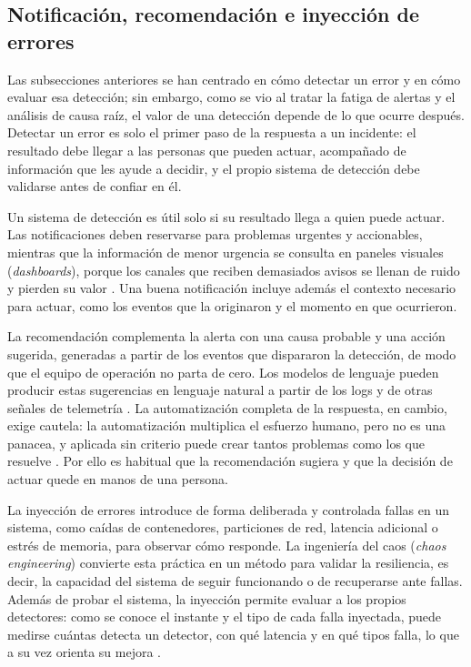 \subsection{Notificación, recomendación e inyección de errores}\label{sec:mt_reaccion}

Las subsecciones anteriores se han centrado en cómo detectar un error y en cómo evaluar esa detección; sin embargo, como se vio al tratar la fatiga de alertas y el análisis de causa raíz, el valor de una detección depende de lo que ocurre después. Detectar un error es solo el primer paso de la respuesta a un incidente: el resultado debe llegar a las personas que pueden actuar, acompañado de información que les ayude a decidir, y el propio sistema de detección debe validarse antes de confiar en él.

Un sistema de detección es útil solo si su resultado llega a quien puede actuar. Las notificaciones deben reservarse para problemas urgentes y accionables, mientras que la información de menor urgencia se consulta en paneles visuales (\textit{dashboards}), porque los canales que reciben demasiados avisos se llenan de ruido y pierden su valor \cite{ewaschuk2016_sre_monitoring}. Una buena notificación incluye además el contexto necesario para actuar, como los eventos que la originaron y el momento en que ocurrieron.

La recomendación complementa la alerta con una causa probable y una acción sugerida, generadas a partir de los eventos que dispararon la detección, de modo que el equipo de operación no parta de cero. Los modelos de lenguaje pueden producir estas sugerencias en lenguaje natural a partir de los logs y de otras señales de telemetría \cite{wang2025_cloudnative_rca}. La automatización completa de la respuesta, en cambio, exige cautela: la automatización multiplica el esfuerzo humano, pero no es una panacea, y aplicada sin criterio puede crear tantos problemas como los que resuelve \cite{murphy2016_sre_automation}. Por ello es habitual que la recomendación sugiera y que la decisión de actuar quede en manos de una persona.

La inyección de errores introduce de forma deliberada y controlada fallas en un sistema, como caídas de contenedores, particiones de red, latencia adicional o estrés de memoria, para observar cómo responde. La ingeniería del caos (\textit{chaos engineering}) convierte esta práctica en un método para validar la resiliencia, es decir, la capacidad del sistema de seguir funcionando o de recuperarse ante fallas. Además de probar el sistema, la inyección permite evaluar a los propios detectores: como se conoce el instante y el tipo de cada falla inyectada, puede medirse cuántas detecta un detector, con qué latencia y en qué tipos falla, lo que a su vez orienta su mejora \cite{pedroso2025_maia}.

